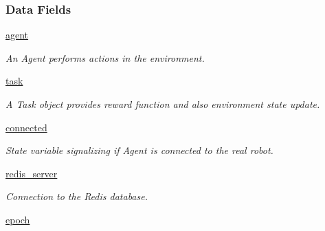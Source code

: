 \subsubsection*{Data Fields}
\begin{DoxyCompactItemize}
\item 
\hypertarget{class_n_f_q_1_1_n_f_q_ab127f2768fff9c4628c413617137a553}{\hyperlink{class_n_f_q_1_1_n_f_q_ab127f2768fff9c4628c413617137a553}{agent}}\label{class_n_f_q_1_1_n_f_q_ab127f2768fff9c4628c413617137a553}

\begin{DoxyCompactList}\small\item\em An Agent performs actions in the environment. \end{DoxyCompactList}\item 
\hypertarget{class_n_f_q_1_1_n_f_q_aa4d42044193f96ecc0d82daab68fb0e6}{\hyperlink{class_n_f_q_1_1_n_f_q_aa4d42044193f96ecc0d82daab68fb0e6}{task}}\label{class_n_f_q_1_1_n_f_q_aa4d42044193f96ecc0d82daab68fb0e6}

\begin{DoxyCompactList}\small\item\em A Task object provides reward function and also environment state update. \end{DoxyCompactList}\item 
\hypertarget{class_n_f_q_1_1_n_f_q_a0d28f70b9b7238e7de23f1128d858d39}{\hyperlink{class_n_f_q_1_1_n_f_q_a0d28f70b9b7238e7de23f1128d858d39}{connected}}\label{class_n_f_q_1_1_n_f_q_a0d28f70b9b7238e7de23f1128d858d39}

\begin{DoxyCompactList}\small\item\em State variable signalizing if Agent is connected to the real robot. \end{DoxyCompactList}\item 
\hypertarget{class_n_f_q_1_1_n_f_q_abf5ffecefbeb3e5456add44dfd66adea}{\hyperlink{class_n_f_q_1_1_n_f_q_abf5ffecefbeb3e5456add44dfd66adea}{redis\+\_\+server}}\label{class_n_f_q_1_1_n_f_q_abf5ffecefbeb3e5456add44dfd66adea}

\begin{DoxyCompactList}\small\item\em Connection to the Redis database. \end{DoxyCompactList}\item 
\hypertarget{class_n_f_q_1_1_n_f_q_a2a24c3eb11c4493c51536a7125927b65}{\hyperlink{class_n_f_q_1_1_n_f_q_a2a24c3eb11c4493c51536a7125927b65}{epoch}}\label{class_n_f_q_1_1_n_f_q_a2a24c3eb11c4493c51536a7125927b65}


\end{DoxyCompactItemize}
